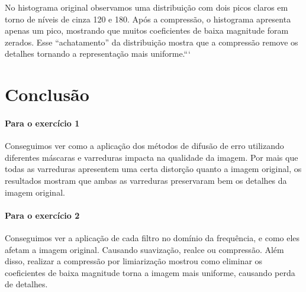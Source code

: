 \documentclass[12pt,a4paper]{article}
\begin{document}
No histograma original observamos uma distribuição com dois picos claros em torno de níveis de cinza 120 e 180. Após a compressão, o histograma apresenta apenas um pico, mostrando que muitos coeficientes de baixa magnitude foram zerados. Esse “achatamento” da distribuição mostra que a compressão remove os detalhes tornando a representação mais uniforme.```

\section{Conclusão}
\paragraph{Para o exercício 1} 
Conseguimos ver como a aplicação dos métodos de difusão de erro utilizando diferentes máscaras e varreduras impacta na qualidade da imagem. Por mais que todas as varreduras apresentem uma certa distorção quanto a imagem original, os resultados mostram que ambas as varreduras preservaram bem os detalhes da imagem original.

\paragraph{Para o exercício 2} 
Conseguimos ver a aplicação de cada filtro no domínio da frequência, e como eles afetam a imagem original. Causando suavização, realce ou compressão. Além disso, realizar a compressão por limiarização mostrou como eliminar os coeficientes de baixa magnitude torna a imagem mais uniforme, causando perda de detalhes.
\end{document}
